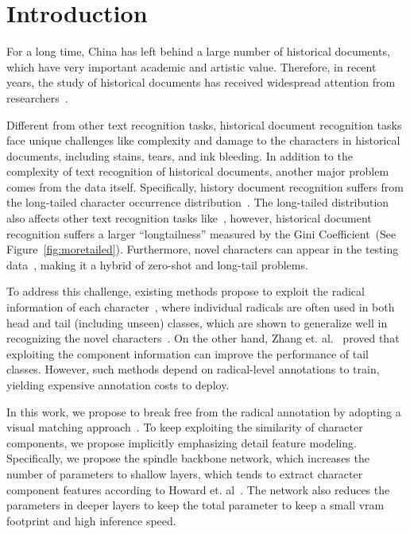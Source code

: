 
\section{Introduction}

For a long time, China has left behind a large number of historical documents, which have very important academic and artistic value. 
Therefore, in recent years, the study of historical documents has received widespread attention from researchers~\cite{jinic21,hde,obc306}. 

Different from other text recognition tasks, historical document recognition tasks face unique challenges like complexity and damage to the characters in historical documents, including stains, tears, and ink bleeding. 
In addition to the complexity of text recognition of historical documents, another major problem comes from the data itself. Specifically, history document recognition suffers from the long-tailed character occurrence distribution~\cite{obc306mk2}. 
The long-tailed distribution also affects other text recognition tasks like~\cite{fudanvi}, however, historical document recognition suffers a larger ``longtailness'' measured by the Gini Coefficient~\cite{tailsurvey}(See Figure~\ref{fig:moretailed}). 
Furthermore, novel characters can appear in the testing data~\cite{jinic21}, making it a hybrid of zero-shot and long-tail problems.



To address this challenge, existing methods propose to exploit the radical information of each character~\cite{denseran}, where individual radicals are often used in both head and tail (including unseen) classes, which are shown to generalize well in recognizing the novel characters~\cite{fewran,zhang20pr}.
On the other hand, Zhang et. al.~\cite{sanicdar23}  proved that exploiting the component information can improve the performance of tail classes.
However, such methods depend on radical-level annotations to train, yielding expensive annotation costs to deploy.

In this work, we propose to break free from the radical annotation by adopting a visual matching approach~\cite{vsdf}. 
To keep exploiting the similarity of character components, we propose implicitly emphasizing detail feature modeling.  
Specifically, we propose the spindle backbone network, which increases the number of parameters to shallow layers, which tends to extract character component features according to Howard et. al~\cite{mobile}. The network also reduces the parameters in deeper layers to keep the total parameter to keep a small vram footprint and high inference speed. 

